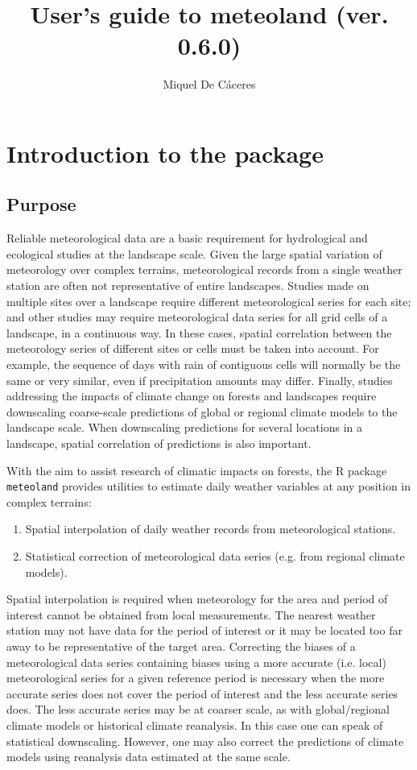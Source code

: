 \documentclass[11pt,a4paper]{article}
\title{User's guide to meteoland (ver. 0.6.0)}
\author[1,2]{Miquel De Cáceres}
\affil[1]{Centre Tecnològic Forestal de Catalunya. Ctra. St. Llorenç de Morunys km 2, 25280, Solsona, Catalonia, Spain}
\affil[2]{CREAF, Cerdanyola del Vallès, 08193, Spain}
\begin{document}


\maketitle
\tableofcontents

\newpage

\section{Introduction to the package}
\subsection{Purpose}
Reliable meteorological data are a basic requirement for hydrological and ecological studies at the landscape scale. Given the large spatial variation of meteorology over complex terrains, meteorological records from a single weather station are often not representative of entire landscapes. Studies made on multiple sites over a landscape require different meteorological series for each site; and other studies may require meteorological data series for all grid cells of a landscape, in a continuous way. In these cases, spatial correlation between the meteorology series of different sites or cells must be taken into account. For example, the sequence of days with rain of contiguous cells will normally be the same or very similar, even if precipitation amounts may differ. Finally, studies addressing the impacts of climate change on forests and landscapes require downscaling coarse-scale predictions  of global or regional climate models to the landscape scale. When downscaling predictions for several locations in a landscape, spatial correlation of predictions is also important.


With the aim to assist research of climatic impacts on forests, the R package \texttt{meteoland} provides utilities to estimate daily weather variables at any position in complex terrains:
\begin{enumerate}
\item{Spatial interpolation of daily weather records from meteorological stations. }
\item{Statistical correction of meteorological data series (e.g. from regional climate models).}
\end{enumerate}
Spatial interpolation is required when meteorology for the area and period of interest cannot be obtained from local measurements. The nearest weather station may not have data for the period of interest or it may be located too far away to be representative of the target area. Correcting the biases of a meteorological data series containing biases using a more accurate (i.e. local) meteorological series for a given reference period is necessary when the more accurate series does not cover the period of interest and the less accurate series does. The less accurate series may be at coarser scale, as with global/regional climate models or historical climate reanalysis. In this case one can speak of statistical downscaling. However, one may also correct the predictions of climate models using reanalysis data estimated at the same scale. 
\end{document}
